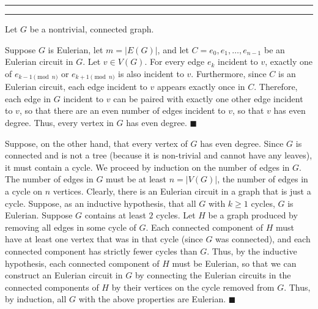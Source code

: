 \documentclass[11pt]{article}
\newcounter{questionCounter}
\newcounter{partCounter}[questionCounter]
\newenvironment{question}[2][\arabic{questionCounter}]{%
    \setcounter{partCounter}{0}%
    \vspace{.25in} \hrule \vspace{0.5em}%
        \noindent{\bf #2}%
    \vspace{0.8em} \hrule \vspace{.10in}%
    \addtocounter{questionCounter}{1}%
}{}
\begin{document}
\begin{question}{Problem 7}
Let $G$ be a nontrivial, connected graph.

Suppose $G$ is Eulerian, let $m = |E(G)|$, and let
$C = e_0,e_1,\ldots,e_{n - 1}$ be an Eulerian circuit in $G$. Let
$v \in V(G)$. For every edge $e_k$ incident to $v$, exactly one of
$e_{k - 1 \pmod n}$ or $e_{k + 1 \pmod n}$ is also incident to $v$.
Furthermore, since $C$ is an Eulerian circuit, each edge incident to $v$
appears exactly once in $C$. Therefore, each edge in $G$ incident to $v$ can
be paired with exactly one other edge incident to $v$, so that there are an
even number of edges incident to $v$, so that $v$ has even degree. Thus,
every vertex in $G$ has even degree. \quad $\blacksquare$

Suppose, on the other hand, that every vertex of $G$ has even degree. Since
$G$ is connected and is not a tree (because it is non-trivial and cannot have
any leaves), it must contain a cycle.
We proceed by induction on the number of edges in $G$. The number of edges in
$G$ must be at least $n = |V(G)|$, the number of edges in a cycle on $n$
vertices. Clearly, there is an Eulerian circuit in a graph that is just a
cycle. Suppose, as an inductive hypothesis, that all $G$ with $k \geq 1$
cycles, $G$ is Eulerian.
Suppose $G$ contains at least $2$ cycles. Let $H$ be a graph produced
by removing all edges in some cycle of $G$. Each connected component of $H$
must have at least one vertex that was in that cycle (since $G$ was
connected), and each connected component has strictly fewer cycles than $G$.
Thus, by the inductive hypothesis, each connected component of $H$ must be
Eulerian, so that we can construct an Eulerian circuit in $G$ by connecting
the Eulerian circuits in the connected components of $H$ by their vertices
on the cycle removed from $G$. Thus, by induction, all $G$ with the above
properties are Eulerian. \quad $\blacksquare$
\end{question}
\end{document}
